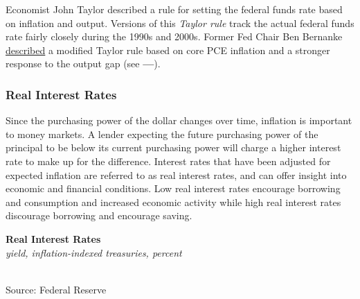 \documentclass{report}
\makeatletter
\newcommand{\tbllink}[1]{\href{https://raw.githubusercontent.com/bdecon/US-chartbook/master/chartbook/data/#1}{\faTable}}
\newcommand*\short[1]{\expandafter\@gobbletwo\number\numexpr#1\relax}
\newcommand{\absnode}[3]{\node[below right, align=left] at (axis cs: #1,#2) {#3};}
\newcommand{\dateaxisticks}{
		date coordinates in=x, axis line style={draw=none},
		xmax={2022-03-15},
		max space between ticks=40,	    
		xtick={{1990-01-01}, {1992-01-01}, {1994-01-01}, 
			{1996-01-01}, {1998-01-01}, {2000-01-01}, 
			{2002-01-01}, {2004-01-01}, {2006-01-01},
			{2008-01-01}, {2010-01-01}, {2012-01-01}, {2014-01-01},
		    {2016-01-01}, {2018-01-01}, {2020-01-01}, {2022-01-01}, 
		    {2024-01-01}, {2026-01-01}},
		minor xtick={{1989-01-01}, {1991-01-01}, {1993-01-01},
			{1995-01-01}, {1997-01-01}, {1999-01-01}, 
			{2001-01-01}, {2003-01-01}, {2005-01-01}, {2007-01-01},
		    {2009-01-01}, {2011-01-01}, {2013-01-01}, {2015-01-01},
		    {2017-01-01}, {2019-01-01}, {2021-01-01}, {2023-01-01}, 
		    {2025-01-01}, {2027-01-01}},
		enlarge y limits={0.06}, enlarge x limits={0.01},
		}
\newcommand{\bbar}[2]{extra #1 ticks = {{#2}}, extra #1 tick labels = ,
		extra #1 tick style = {grid=major, grid style={thick, black!25}},}
\newcommand{\stdline}[4]{\addplot[very thick, no markers, color=#1] 
		table [x=#2, y=#3, col sep=comma] {#4};	}
\newcommand{\recbars}{
		\fill[color=black!10] (axis cs:{2007-12-01},\pgfkeysvalueof{/pgfplots/ymin}) rectangle 
			(axis cs:{2009-07-01}, \pgfkeysvalueof{/pgfplots/ymax});
		\fill[color=black!10] (axis cs:{2020-02-01},\pgfkeysvalueof{/pgfplots/ymin}) rectangle 
			(axis cs:{2020-05-01}, \pgfkeysvalueof{/pgfplots/ymax});}
\makeatother
\begin{document}
{{\begin{minipage}{0.76\textwidth}
\small Economist John Taylor described a rule for setting the federal funds rate based on inflation and output. Versions of this \textit{Taylor rule} track the actual federal funds rate fairly closely during the 1990s and 2000s. Former Fed Chair Ben Bernanke \href{https://www.brookings.edu/blog/ben-bernanke/2015/04/28/the-taylor-rule-a-benchmark-for-monetary-policy/}{described} a modified Taylor rule based on core PCE inflation and a stronger response to the output gap (see {\color{cyan!80!white}\textbf{---}}). 
\end{minipage}
\newpage
\begin{minipage}{0.76\textwidth}
\subsubsection*{Real Interest Rates}
\small Since the purchasing power of the dollar changes over time, inflation is important to money markets. A lender expecting the future purchasing power of the principal to be below its current purchasing power will charge a higher interest rate to make up for the difference. Interest rates that have been adjusted for expected inflation are referred to as real interest rates, and can offer insight into economic and financial conditions. Low real interest rates encourage borrowing and consumption and increased economic activity while high real interest rates discourage borrowing and encourage saving. 

 
\vspace{1mm} 

\normalsize \textbf{Real Interest Rates}\\
\footnotesize{\textit{yield, inflation-indexed treasuries, percent}}\\
\hspace*{-2mm} \\
\footnotesize{Source: Federal Reserve} \hfill \tbllink{real_rates.csv}
\end{minipage}
\newpage
\begin{minipage}{0.76\textwidth}

\end{minipage}}}
\end{document}
